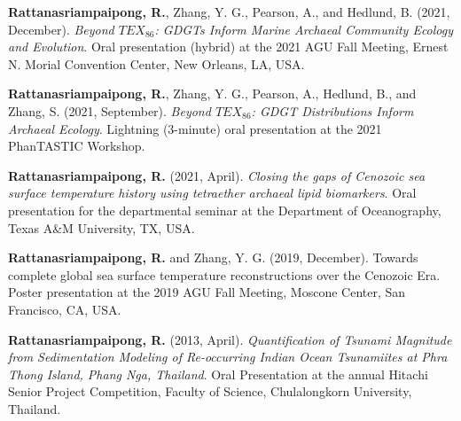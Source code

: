 \documentclass[10pt, letter]{article}
\newcommand{\myname}[1]{\textbf{Rattanasriampaipong, R.}}
\begin{document}
\begin{etaremune}
\item {\myname{rattanasriampaipong}}, Zhang, Y. G., Pearson, A., and Hedlund, B. (2021, December). \textit{Beyond $TEX_{86}$: GDGTs Inform Marine Archaeal Community Ecology and Evolution}. Oral presentation (hybrid) at the 2021 AGU Fall Meeting, Ernest N. Morial Convention Center, New Orleans, LA, USA.

\item {\myname{rattanasriampaipong}}, Zhang, Y. G., Pearson, A., Hedlund, B., and Zhang, S. (2021, September). \textit{Beyond $TEX_{86}$: GDGT Distributions Inform Archaeal Ecology}. Lightning (3-minute) oral presentation at the 2021 PhanTASTIC Workshop.

\item {\myname{rattanasriampaipong}} (2021, April). \textit{Closing the gaps of Cenozoic sea surface temperature history using tetraether archaeal lipid biomarkers}. Oral presentation for the departmental seminar at the Department of Oceanography, Texas A\&M University, TX, USA.

\item {\myname{rattanasriampaipong}} and Zhang, Y. G. (2019, December). Towards complete global sea surface temperature reconstructions over the Cenozoic Era. Poster presentation at the 2019 AGU Fall Meeting, Moscone Center, San Francisco, CA, USA.

\item {\myname{rattanasriampaipong}} (2013, April). \textit{Quantification of Tsunami Magnitude from Sedimentation Modeling of Re-occurring Indian Ocean Tsunamiites at Phra Thong Island, Phang Nga, Thailand}. Oral Presentation at the annual Hitachi Senior Project Competition, Faculty of Science, Chulalongkorn University, Thailand.
\end{etaremune}
\end{document}

